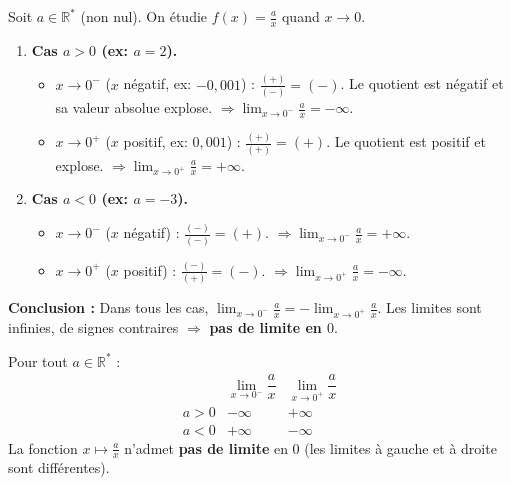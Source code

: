 \documentclass[11pt]{article}
\begin{document}
\begin{experience}
Soit $a \in \mathbb{R}^*$ (non nul). On étudie $f(x) = \frac{a}{x}$ quand $x \to 0$.
\begin{enumerate}
    \item \textbf{Cas $a > 0$ (ex: $a=2$).}
    \begin{itemize}
        \item $x \to 0^{-}$ ($x$ négatif, ex: $-0,001$) : $\frac{(+)}{(-)} = (-)$. Le quotient est négatif et sa valeur absolue explose. $\Rightarrow \lim_{x \to 0^{-}} \frac{a}{x} = -\infty$.
        \item $x \to 0^{+}$ ($x$ positif, ex: $0,001$) : $\frac{(+)}{(+)} = (+)$. Le quotient est positif et explose. $\Rightarrow \lim_{x \to 0^{+}} \frac{a}{x} = +\infty$.
    \end{itemize}
    \item \textbf{Cas $a < 0$ (ex: $a=-3$).}
    \begin{itemize}
        \item $x \to 0^{-}$ ($x$ négatif) : $\frac{(-)}{(-)} = (+)$. $\Rightarrow \lim_{x \to 0^{-}} \frac{a}{x} = +\infty$.
        \item $x \to 0^{+}$ ($x$ positif) : $\frac{(-)}{(+)} = (-)$. $\Rightarrow \lim_{x \to 0^{+}} \frac{a}{x} = -\infty$.
    \end{itemize}
\end{enumerate}
\textbf{Conclusion :} Dans tous les cas, $\lim_{x \to 0^{-}} \frac{a}{x} = -\lim_{x \to 0^{+}} \frac{a}{x}$. Les limites sont infinies, de signes contraires $\Rightarrow$ \textbf{pas de limite en $0$}.
\end{experience}

\begin{propriete}
Pour tout $a \in \mathbb{R}^*$ :
\[
\begin{array}{c|cc}
 & \lim\limits_{x \to 0^{-}} \dfrac{a}{x} & \lim\limits_{x \to 0^{+}} \dfrac{a}{x} \\ \hline
a > 0 & -\infty & +\infty \\
a < 0 & +\infty & -\infty
\end{array}
\]
La fonction $x \mapsto \frac{a}{x}$ n'admet \textbf{pas de limite} en $0$ (les limites à gauche et à droite sont différentes).
\end{propriete}
\end{document}
